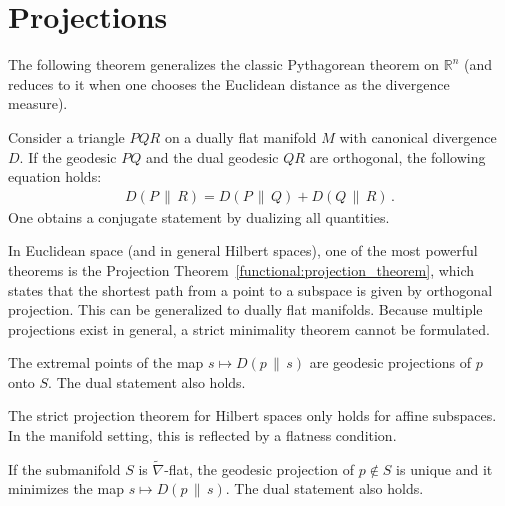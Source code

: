\section{Projections}

    The following theorem generalizes the classic Pythagorean theorem on $\mathbb{R}^n$ (and reduces to it when one chooses the Euclidean distance as the divergence measure).
    \begin{theorem}[Pythagoras]
        Consider a triangle $PQR$ on a dually flat manifold $M$ with canonical divergence $D$. If the geodesic $PQ$ and the dual geodesic $QR$ are orthogonal, the following equation holds:
        \begin{gather}
            D(P\,\|\,R) = D(P\,\|\,Q) + D(Q\,\|\,R)\,.
        \end{gather}
        One obtains a conjugate statement by dualizing all quantities.
    \end{theorem}

    In Euclidean space (and in general Hilbert spaces), one of the most powerful theorems is the Projection Theorem~\ref{functional:projection_theorem}, which states that the shortest path from a point to a subspace is given by orthogonal projection. This can be generalized to dually flat manifolds.
    Because multiple projections exist in general, a strict minimality theorem cannot be formulated.
    \begin{theorem}
        The extremal points of the map $s\mapsto D(p\,\|\,s)$ are geodesic projections of $p$ onto $S$. The dual statement also holds.
    \end{theorem}
    The strict projection theorem for Hilbert spaces only holds for affine subspaces. In the manifold setting, this is reflected by a flatness condition.
    \begin{property}
        If the submanifold $S$ is $\widetilde{\nabla}$-flat, the geodesic projection of $p\not\in S$ is unique and it minimizes the map $s\mapsto D(p\,\|\,s)$. The dual statement also holds.
    \end{property}

